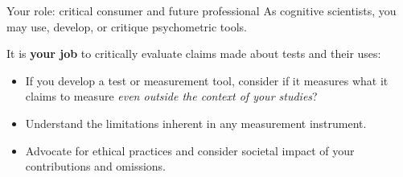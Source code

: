 \documentclass[aspectratio=169]{beamer}
\begin{document}
\begin{frame}{Your role: critical consumer and future professional}
  As cognitive scientists, you may use, develop, or critique psychometric tools.\pause
  
  It is \textbf{your job} to critically evaluate claims made about tests and their uses:\pause
  \begin{itemize}
    \item If you develop a test or measurement tool, consider if it measures what it claims to measure \textit{even outside the context of your studies}?\pause
    \item Understand the limitations inherent in any measurement instrument.\pause
    \item Advocate for ethical practices and consider societal impact of your contributions and omissions.
  \end{itemize}
\end{frame}

\maketitle
\end{document}
